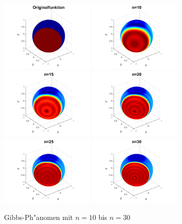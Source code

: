 \begin{refsection}
\begin{figure}%
\centering
\includegraphics[width=0.4\textwidth]{kugel/Gibbs/GibbsOriginalFunktion.pdf}
\includegraphics[width=0.4\textwidth]{kugel/Gibbs/GibbsN_10.pdf}
\includegraphics[width=0.4\textwidth]{kugel/Gibbs/GibbsN_15.pdf}
\includegraphics[width=0.4\textwidth]{kugel/Gibbs/GibbsN_20.pdf}
\includegraphics[width=0.4\textwidth]{kugel/Gibbs/GibbsN_25.pdf}
\includegraphics[width=0.4\textwidth]{kugel/Gibbs/GibbsN_30.pdf}
\caption{Gibbs-Ph"anomen mit $n=10$ bis $n=30$
\label{skript:Gibbs2}}
\end{figure}

\printbibliography[heading=subbibliography]
\end{refsection}
